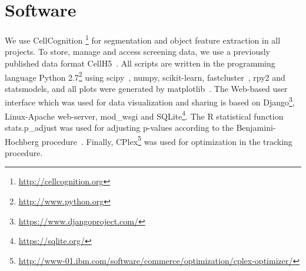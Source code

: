 \section{Software}
We use CellCognition \cite{cellcognition}\footnote{\href{http://cellcognition.org}{http://cellcognition.org}} for segmentation and object feature extraction in all projects. To store, manage and access
screening data, we use a previously published data format CellH5~\cite{Sommer2013}. All scripts are written in the programming language Python 2.7\footnote{\href{http://www.python.org}{http://www.python.org}}
using scipy~\cite{scipy}, numpy, scikit-learn, fastcluster~\cite{fastcluster}, rpy2 and statsmodels, and all plots were generated by matplotlib~\cite{matplotlib}. The Web-based user interface which was used for data visualization and sharing is based on Django\footnote{\href{https://www.djangoproject.com/}{https://www.djangoproject.com/}}, Linux-Apache web-server, mod\_wsgi and SQLite\footnote{\href{https://sqlite.org/}{https://sqlite.org/}}.
The R statistical function stats.p\_adjust was used for adjusting p-values according to the Benjamini-Hochberg procedure~\cite{Benjamini1}. Finally, CPlex\footnote{\href{http://www-01.ibm.com/software/commerce/optimization/cplex-optimizer/}{http://www-01.ibm.com/software/commerce/optimization/cplex-optimizer/}} was used for optimization in the tracking procedure.